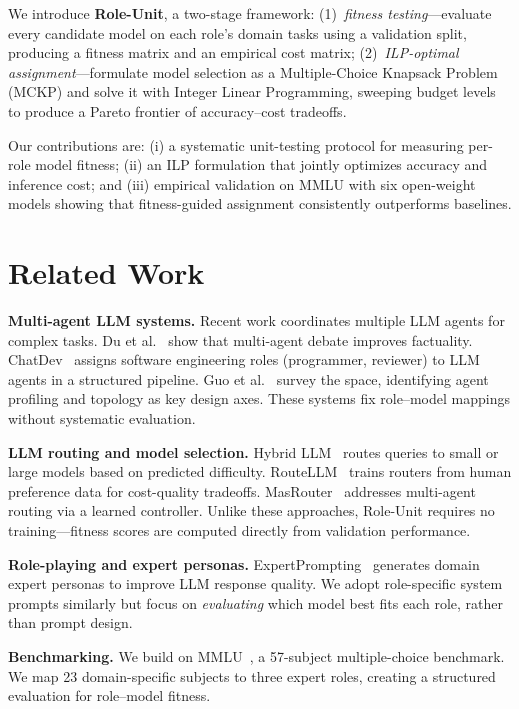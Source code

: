 \documentclass[sigconf,nonacm]{acmart}
\begin{document}
We introduce \textbf{Role-Unit}, a two-stage framework: (1)~\textit{fitness testing}---evaluate every candidate model on each role's domain tasks using a validation split, producing a fitness matrix and an empirical cost matrix; (2)~\textit{ILP-optimal assignment}---formulate model selection as a Multiple-Choice Knapsack Problem (MCKP) and solve it with Integer Linear Programming, sweeping budget levels to produce a Pareto frontier of accuracy--cost tradeoffs.

Our contributions are: (i) a systematic unit-testing protocol for measuring per-role model fitness; (ii) an ILP formulation that jointly optimizes accuracy and inference cost; and (iii) empirical validation on MMLU with six open-weight models showing that fitness-guided assignment consistently outperforms baselines.

\section{Related Work}

\textbf{Multi-agent LLM systems.} Recent work coordinates multiple LLM agents for complex tasks. Du et al.~\cite{du2024improving} show that multi-agent debate improves factuality. ChatDev~\cite{qian2024chatdev} assigns software engineering roles (programmer, reviewer) to LLM agents in a structured pipeline. Guo et al.~\cite{guo2024large} survey the space, identifying agent profiling and topology as key design axes. These systems fix role--model mappings without systematic evaluation.

\textbf{LLM routing and model selection.} Hybrid LLM~\cite{ding2024hybrid} routes queries to small or large models based on predicted difficulty. RouteLLM~\cite{ong2024routellm} trains routers from human preference data for cost-quality tradeoffs. MasRouter~\cite{zhong2025masrouter} addresses multi-agent routing via a learned controller. Unlike these approaches, Role-Unit requires no training---fitness scores are computed directly from validation performance.

\textbf{Role-playing and expert personas.} ExpertPrompting~\cite{xu2023expertprompting} generates domain expert personas to improve LLM response quality. We adopt role-specific system prompts similarly but focus on \textit{evaluating} which model best fits each role, rather than prompt design.

\textbf{Benchmarking.} We build on MMLU~\cite{hendrycks2021measuring}, a 57-subject multiple-choice benchmark. We map 23 domain-specific subjects to three expert roles, creating a structured evaluation for role--model fitness.
\end{document}
